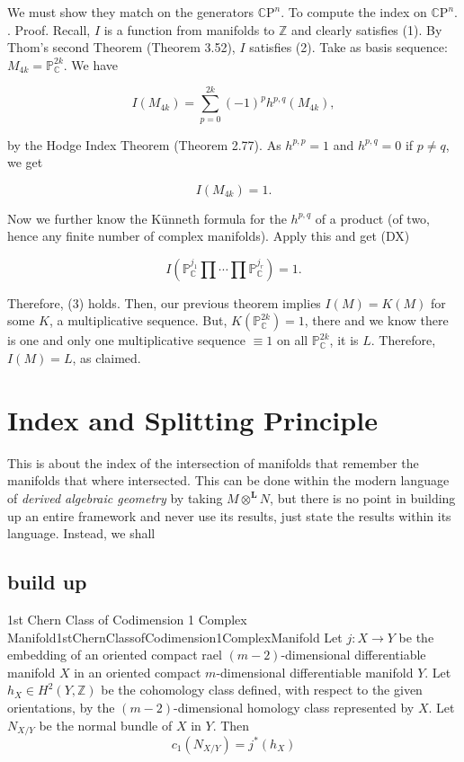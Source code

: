 \documentclass{book}
\newcommand{\CP}{\mathbb{C}\mathrm{P}}
\renewcommand{\bf}[1]{\textbf{#1}}
\begin{document}
\begin{Proof}
  We must show they match on the generators $\CP^n$. To compute the index on $\CP^n$.
  \cite[p.231]{gallierComplexAlgebraicGeometry2011}.
  Proof. Recall, $I$ is a function from manifolds to $\mathbb{Z}$ and clearly satisfies (1). By {\color{red}Thom's second Theorem (Theorem 3.52)}, $I$ satisfies (2). Take as basis sequence: $M_{4k}=\mathbb{P}_\mathbb{C}^{2k}$. We have

\[
    I(M_{4k})=\sum_{p=0}^{2k}(-1)^ph^{p,q}(M_{4k}),
\]

by the {\color{red}Hodge Index Theorem (Theorem 2.77)}. As $h^{p,p}=1$ and $h^{p,q}=0$ if $p\neq q$, we get

\[
    I(M_{4k})=1.
\]

Now we further know the Künneth formula for the $h^{p,q}$ of a product (of two, hence any finite number of complex manifolds). Apply this and get (DX)

\[
    I(\mathbb{P}_\mathbb{C}^{j_1}\prod\cdots\prod\mathbb{P}_\mathbb{C}^{j_r})=1.
\]

Therefore, (3) holds. Then, our previous theorem implies $I(M)=K(M)$ for some $K$, a multiplicative sequence. But, $K(\mathbb{P}_\mathbb{C}^{2k})=1$, there and we know there is one and only one multiplicative sequence $\equiv1$ on all $\mathbb{P}_\mathbb{C}^{2k}$, it is $L$. Therefore, $I(M)=L$, as claimed.
\end{Proof}

\section{Index and Splitting Principle}

This is about the index of the intersection of manifolds that remember the manifolds that where intersected.
This can be done within the modern language of \emph{derived algebraic geometry} by taking $M\otimes^{\bf{L}}
N$, but there is no point in building up an entire framework and never use its results, just state the results
within its language. Instead, we shall

\subsection*{build up}

\begin{thm}{1st Chern Class of Codimension 1 Complex Manifold}{1stChernClassofCodimension1ComplexManifold}
Let $j: X \to Y$ be the embedding of an oriented compact rael $(m-2)$-dimensional differentiable manifold $X$ in an
oriented compact $m$-dimensional differentiable manifold $Y$. Let $h_X \in H^2(Y,\mathbb{Z})$ be the cohomology
class defined, with respect to the given orientations, by the $(m-2)$-dimensional homology class represented
by $X$. Let $N_{X/Y}$ be the normal bundle of $X$ in $Y$. Then
\[
  c_1(N_{X/Y}) = j^*(h_X)
\]
\end{thm}
\end{document}
